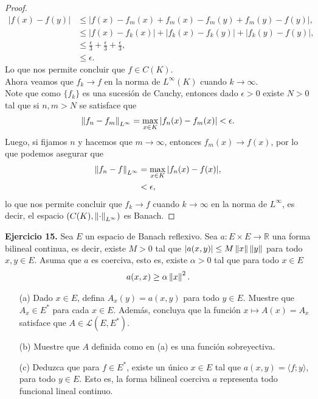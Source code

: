 \begin{proof}
  \begin{align*}
    |f(x)-f(y)|&\leq|f(x)-f_{m}(x)+f_{m}(x)-f_{m}(y)+f_{m}(y)-f(y)|,\\
    &\leq |f(x)-f_{k}(x)|+|f_{k}(x)-f_{k}(y)|+|f_{k}(y)-f(y)|,\\
    &\leq \frac{\epsilon}{3}+\frac{\epsilon}{3}+\frac{\epsilon}{3},\\
    &\leq \epsilon.
  \end{align*}
  Lo que nos permite concluir que $f\in C(K)$.\\
  Ahora veamos que $f_{k}\to f$ en la norma de $L^{\infty}(K)$ cuando $k\to\infty$.\\
  Note que como $\{f_{k}\}$ es una sucesión de Cauchy, entonces dado $\epsilon>0$ existe $N>0$ tal que si $n,m>N$ se satisface que
  \begin{align*}
    \left\|f_{n}-f_{m}\right\|_{L^{\infty}}=\max_{x\in K}|f_{n}(x)-f_{m}(x)|<\epsilon.
  \end{align*}
  Luego, si fijamos $n$ y hacemos que $m\to \infty$, entonces $f_{m}(x)\to f(x)$, por lo que podemos asegurar que
  \begin{align*}
    \left\|f_{n}-f\right\|_{L^{\infty}}&=\max_{x\in K}|f_{n}(x)-f(x)|,\\
    &<\epsilon,
  \end{align*}
  lo que nos permite concluir que $f_{k}\to f$ cuando $k\to \infty$ en la norma de $L^{\infty}$, es decir, el espacio $(C(K),\left\|\cdot\right\|_{L^{\infty}})$ es Banach. 
\end{proof}



\textbf{Ejercicio 15.} Sea $E$ un espacio de Banach reflexivo. Sea $a:E\times E\to \mathbb{R}$ una forma bilineal continua, es decir, existe $M>0$ tal que $|a(x,y)|\leq M\left\|x\right\|\left\|y\right\|$ para todo $x,y \in E$. Asuma que $a$ es coerciva, esto es, existe $\alpha>0$ tal que para todo $x \in E$
\begin{align*}
    a(x,x)\geq \alpha\left\|x\right\|^2.
\end{align*}
\begin{enumerate}
    \item[(a)] Dado $x \in E$, defina $A_x(y)=a(x,y)$ para todo $y \in E$. Muestre que $A_x\in E^*$ para cada $x \in E$. Además, concluya que la función $x\mapsto A(x)=A_x$ satisface que $A\in \mathcal{L}(E,E^*)$.
    \item[(b)] Muestre que $A$ definida como en (a) es una función sobreyectiva.
    \item[(c)] Deduzca que para $f \in E^*$, existe un único $x \in E$ tal que $a(x,y)=\langle f;y\rangle$, para todo $y \in E$. Esto es, la forma bilineal coerciva $a$ representa todo funcional lineal continuo.
\end{enumerate}


